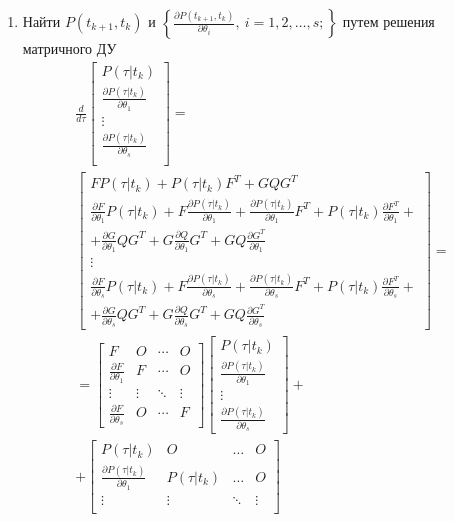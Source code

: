 \documentclass[a4paper,14pt]{extarticle}
\newcommand{\pd}[2]{\frac{\partial #1}{\partial #2}}
\begin{document}
\begin{enumerate}
	\newpage

	\item Найти $P(t_{k+1}, t_k)$ и $\left\{\pd{P(t_{k+1}, t_k)}{\theta_i},\
		i=1,2,\ldots,s;\right\}$ путем решения матричного ДУ
		\begin{gather*}
	\frac{d}{d\tau}	
	\begin{bmatrix}
		P(\tau|t_k) \\
		\pd{P(\tau|t_k)}{\theta_1} \\
		\vdots \\
		\pd{P(\tau|t_k)}{\theta_s} \\
	\end{bmatrix} = \\
	\begin{bmatrix}
		F P(\tau|t_k) + P(\tau|t_k) F^T + GQG^T \\
		\pd{F}{\theta_1} P(\tau|t_k) + F \pd{P(\tau|t_k)}{\theta_1} +
			\pd{P(\tau|t_k)}{\theta_1} F^T + P(\tau|t_k) \pd{F^T}{\theta_1} + \\
			+ \pd{G}{\theta_1} Q G^T + G \pd{Q}{\theta_1} G^T +
			G Q \pd{G^T}{\theta_1} \\
		\vdots \\
		\pd{F}{\theta_s} P(\tau|t_k) + F \pd{P(\tau|t_k)}{\theta_s} +
			\pd{P(\tau|t_k)}{\theta_s} F^T + P(\tau|t_k) \pd{F^T}{\theta_s} + \\
			+ \pd{G}{\theta_s} Q G^T + G \pd{Q}{\theta_s} G^T +
			G Q \pd{G^T}{\theta_s}  
	\end{bmatrix} = \\ =
	\begin{bmatrix}
		F & O & \cdots & O \\
		\pd{F}{\theta_1} & F & \cdots & O \\
		\vdots & \vdots & \ddots & \vdots \\
		\pd{F}{\theta_s} & O & \cdots & F
	\end{bmatrix}
	\begin{bmatrix}
		P(\tau|t_k) \\
		\pd{P(\tau|t_k)}{\theta_1} \\
		\vdots \\
		\pd{P(\tau|t_k)}{\theta_s}
	\end{bmatrix} + \\ +
	\begin{bmatrix}
		P(\tau|t_k) & O & \ldots & O \\
		\pd{P(\tau|t_k)}{\theta_1} & P(\tau|t_k) & \ldots & O \\
		\vdots & \vdots & \ddots & \vdots \\

\end{bmatrix}
\end{gather*}
\end{enumerate}
\end{document}

